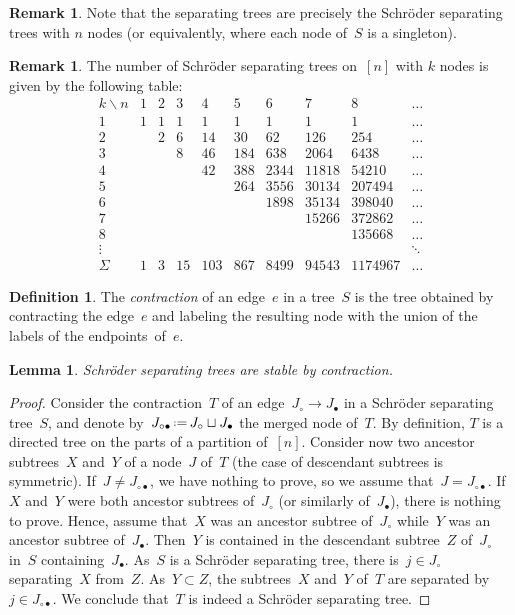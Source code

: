 \documentclass{amsart}
\newtheorem{lemma}[theorem]{Lemma}
\theoremstyle{definition}
\newtheorem{definition}[theorem]{Definition}
\newtheorem{remark}[theorem]{Remark}
\newcommand{\eqdef}{\mbox{\,\raisebox{0.2ex}{\scriptsize\ensuremath{\mathrm:}}\ensuremath{=}\,}} %
\newcommand{\darkblue}{\color{darkblue}} %
\newcommand{\defn}[1]{\textsl{\darkblue #1}} %
\begin{document}
\begin{remark}
Note that the separating trees are precisely the Schröder separating trees with $n$ nodes (or equivalently, where each node of~$S$ is a singleton).
\end{remark}

\begin{remark}
The number of Schröder separating trees on~$[n]$ with $k$ nodes is given by the following table:
\[
\begin{array}{c|cccccccccc}
k \backslash n & 1 & 2 & 3 & 4 & 5 & 6 & 7 & 8 & \dots \\
\hline
1 & 1 & 1 & 1 & 1 & 1 & 1 & 1 & 1 & \dots\\
2 & & 2 & 6 & 14 & 30 & 62 & 126 & 254 & \dots \\
3 & & & 8 & 46 & 184 & 638 & 2064 & 6438 & \dots\\
4 & & & & 42 & 388 & 2344 & 11818 & 54210 & \dots\\
5 & & & & & 264 & 3556 & 30134 & 207494 & \dots\\
6 & & & & & & 1898 & 35134 & 398040 & \dots\\ 
7 & & & & & & & 15266 & 372862 & \dots\\ 
8 & & & & & & & & 135668 & \dots \\
\vdots & & & & & & & & & \ddots \\
\hline
\Sigma & 1 & 3 & 15 & 103 & 867 & 8499 & 94543 & 1174967 & \dots
\end{array}
\]
\end{remark}

\begin{definition}
The \defn{contraction} of an edge~$e$ in a tree~$S$ is the tree obtained by contracting the edge~$e$ and labeling the resulting node with the union of the labels of the endpoints~of~$e$.
\end{definition}

\begin{lemma}
\label{lem:contractionSchroderSeparatingTree}
Schröder separating trees are stable by contraction.
\end{lemma}

\begin{proof}
Consider the contraction~$T$ of an edge~$J_\circ \to J_\bullet$ in a Schröder separating tree~$S$, and denote by~$J_{\circ\bullet} \eqdef J_\circ \sqcup J_\bullet$ the merged node of~$T$.
By definition, $T$ is a directed tree on the parts of a partition of~$[n]$.
Consider now two ancestor subtrees~$X$ and~$Y$ of a node~$J$ of~$T$ (the case of descendant subtrees is symmetric).
If~$J \ne J_{\circ\bullet}$, we have nothing to prove, so we assume that~$J = J_{\circ\bullet}$.
If~$X$ and~$Y$ were both ancestor subtrees of~$J_\circ$ (or similarly of~$J_\bullet$), there is nothing to prove.
Hence, assume that~$X$ was an ancestor subtree of~$J_\circ$ while~$Y$ was an ancestor subtree of~$J_\bullet$.
Then~$Y$ is contained in the descendant subtree~$Z$ of~$J_\circ$ in~$S$ containing~$J_\bullet$.
As~$S$ is a Schröder separating tree, there is~$j \in J_\circ$ separating~$X$ from~$Z$.
As~$Y \subset Z$, the subtrees~$X$ and~$Y$ of~$T$ are separated by~$j \in J_{\circ\bullet}$.
We conclude that~$T$ is indeed a Schröder separating tree.
\end{proof}
\end{document}
